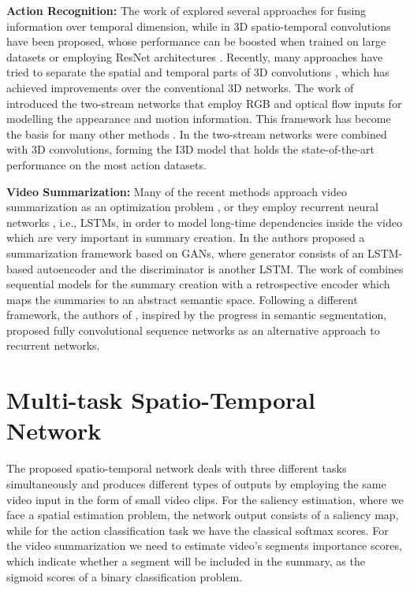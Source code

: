 \documentclass[10pt,twocolumn,letterpaper]{article}
\begin{document}
\noindent\textbf{Action Recognition:} The work of \cite{karpathy2014large} explored several approaches for fusing information over temporal dimension, while in \cite{ji2013} 3D spatio-temporal convolutions have been proposed, whose performance can be boosted when trained on large datasets \cite{tran2015learning,varol2018long} or employing ResNet architectures \cite{hara2018can}. Recently, many approaches have tried to separate the spatial and temporal parts of 3D convolutions \cite{sun2015human,Wang_2018_CVPR,tran2018closer}, which has achieved improvements over the conventional 3D networks. The work of \cite{simonyan_two-stream_2014} introduced the two-stream networks that employ RGB and optical flow inputs for modelling the appearance and motion information. This framework has become the basis for many other methods \cite{Wang_TDD_2015,feichtenhofer2016,feichtenhofer_resconvnets_2016,wang2016temporal,chen_ssn_2017,feichtenhofer2017spatiotemporal}. In \cite{carreira2017quo} the two-stream networks were combined with 3D convolutions, forming the I3D model that holds the state-of-the-art performance on the most action datasets.    

\noindent\textbf{Video Summarization:} Many of the recent methods approach video summarization as an optimization problem \cite{GygliCVPR15,song2015tvsum,zhang2016summary,elhamifar2017online,plummer2017enhancing}, or they employ recurrent neural networks \cite{zhang2016video, zhao2018hsa}, i.e., LSTMs, in order to model long-time dependencies inside the video which are very important in summary creation. In \cite{mahasseni2017unsupervised} the authors proposed a summarization framework based on GANs, where generator consists of an LSTM-based autoencoder and the discriminator is another LSTM. The work of \cite{zhang2018retrospective} combines sequential models for the summary creation with a retrospective encoder which maps the summaries to an abstract semantic space. Following a different framework, the authors of \cite{rochan2018video}, inspired by the progress in semantic segmentation, proposed fully convolutional sequence networks as an alternative approach to recurrent networks.

\section{Multi-task Spatio-Temporal Network}

The proposed spatio-temporal network deals with three different tasks simultaneously and produces different types of outputs by employing the same video input in the form of small video clips. For the saliency estimation, where we face a spatial estimation problem, the network output consists of a saliency map, while for the action classification task we have the classical softmax scores. For the video summarization we need to estimate video's segments importance scores, which indicate whether a segment will be included in the summary, as the sigmoid scores of a binary classification problem.     
\end{document}
